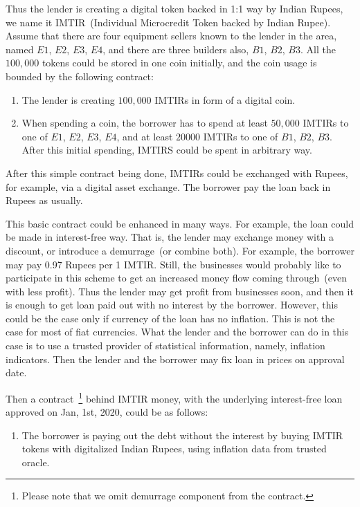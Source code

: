 \documentclass[]{llncs}   %
\begin{document}
 Thus the lender is creating a digital token backed in 1:1 way by Indian Rupees, we name it IMTIR~(Individual Microcredit Token backed by Indian Rupee). Assume that there are four equipment sellers known to the lender in the area, named $E1$, $E2$, $E3$, $E4$, and
 there are three builders also, $B1$, $B2$, $B3$. All the $100,000$ tokens could be stored in one coin initially, and the coin usage is bounded by the following contract:

 \begin{enumerate}
    \item{} The lender is creating $100,000$ IMTIRs in form of a digital coin.
    \item{} When spending a coin, the borrower has to spend at least $50,000$ IMTIRs to one of $E1$, $E2$, $E3$, $E4$, and
    at least $20000$ IMTIRs to one of $B1$, $B2$, $B3$. After this initial spending, IMTIRS could be spent in arbitrary way.
\end{enumerate}

 After this simple contract being done, IMTIRs could be exchanged with Rupees, for example, via a digital asset exchange. The borrower
 pay the loan back in Rupees as usually. 

 This basic contract could be enhanced in many ways. For example, the loan could be made in interest-free way. That is,
 the lender may exchange money with a discount, or introduce a demurrage~(or combine both). For example, the borrower may pay 
 0.97 Rupees per 1 IMTIR. Still, the businesses would probably like to participate in this scheme to get an increased money flow coming through~(even with less profit). Thus the lender may get profit from businesses soon, and then it is enough to get loan paid out with no interest by the borrower. However, this could be the case only if currency of the loan has no inflation. This is not the case for most of fiat currencies. What the lender and the borrower can do in this case is to use a trusted provider of statistical
 information, namely, inflation indicators. Then the lender and the borrower may fix loan in prices on approval date.

  Then a contract~\footnote{Please note that we omit demurrage component from
 the contract.} behind IMTIR money, with the underlying interest-free loan approved on Jan, 1st, 2020,
 could be as follows:

 \begin{enumerate}
        \item{} The borrower is paying out the debt without the interest by buying IMTIR tokens with digitalized Indian 
    Rupees, using inflation data from trusted oracle.
 \end{enumerate}
\end{document}
